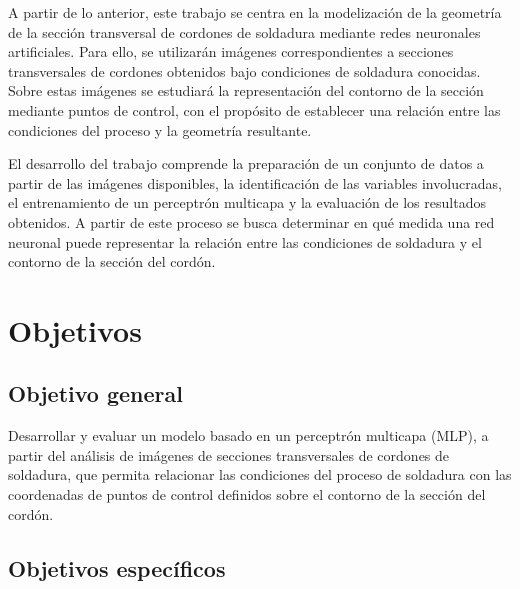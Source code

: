 A partir de lo anterior, este trabajo se centra en la modelización de la geometría de la sección transversal de cordones de soldadura mediante redes neuronales artificiales. Para ello, se utilizarán imágenes correspondientes a secciones transversales de cordones obtenidos bajo condiciones de soldadura conocidas. Sobre estas imágenes se estudiará la representación del contorno de la sección mediante puntos de control, con el propósito de establecer una relación entre las condiciones del proceso y la geometría resultante.

El desarrollo del trabajo comprende la preparación de un conjunto de datos a partir de las imágenes disponibles, la identificación de las variables involucradas, el entrenamiento de un perceptrón multicapa y la evaluación de los resultados obtenidos. A partir de este proceso se busca determinar en qué medida una red neuronal puede representar la relación entre las condiciones de soldadura y el contorno de la sección del cordón.

\section{Objetivos}

\subsection{Objetivo general}

Desarrollar y evaluar un modelo basado en un perceptrón multicapa (MLP), a partir del análisis de imágenes de secciones transversales de cordones de soldadura, que permita relacionar las condiciones del proceso de soldadura con las coordenadas de puntos de control definidos sobre el contorno de la sección del cordón.

\subsection{Objetivos específicos}

